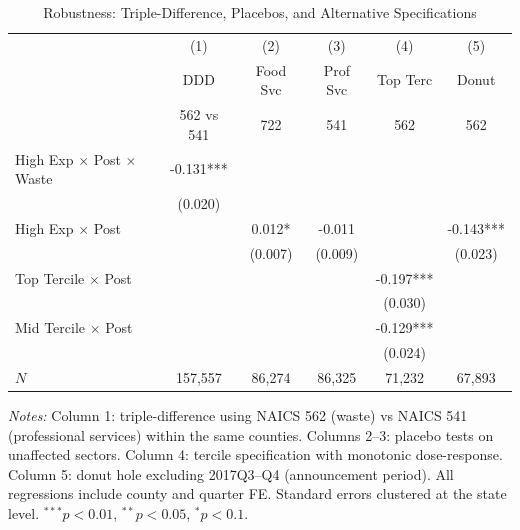 \begin{table}[t]
\centering
\caption{Robustness: Triple-Difference, Placebos, and Alternative Specifications}
\label{tab:robustness}
\begin{threeparttable}
\small
\begin{tabular}{lccccc}
\hline\hline
 & (1) & (2) & (3) & (4) & (5) \\
 & DDD & Food Svc & Prof Svc & Top Terc & Donut \\
 & 562 vs 541 & 722 & 541 & 562 & 562 \\
\hline
High Exp $\times$ Post $\times$ Waste & -0.131*** & & & & \\
 & (0.020) & & & & \\
High Exp $\times$ Post & & 0.012* & -0.011 & & -0.143*** \\
 & & (0.007) & (0.009) & & (0.023) \\
Top Tercile $\times$ Post & & & & -0.197*** & \\
 & & & & (0.030) & \\
Mid Tercile $\times$ Post & & & & -0.129*** & \\
 & & & & (0.024) & \\
\hline
$N$ & 157,557 & 86,274 & 86,325 & 71,232 & 67,893 \\
\hline\hline
\end{tabular}
\begin{tablenotes}
\item \textit{Notes:} Column 1: triple-difference using NAICS 562 (waste) vs NAICS 541 (professional services) within the same counties. Columns 2--3: placebo tests on unaffected sectors. Column 4: tercile specification with monotonic dose-response. Column 5: donut hole excluding 2017Q3--Q4 (announcement period). All regressions include county and quarter FE. Standard errors clustered at the state level. $^{***}p<0.01$, $^{**}p<0.05$, $^{*}p<0.1$.
\end{tablenotes}
\end{threeparttable}
\end{table}
